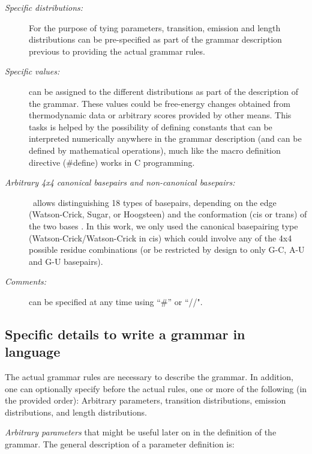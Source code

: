 \begin{description}
\item[\textsl{Specific distributions:}] For the purpose of tying
  parameters, transition, emission and length distributions can be
  pre-specified as part of the grammar description previous to
  providing the actual grammar rules.

\item[\textsl{Specific values:}] can be assigned to the
  different distributions as part of the description of the
  grammar. These values could be free-energy changes obtained from
  thermodynamic data or arbitrary scores provided by other means.
  This tasks is helped by the possibility of defining constants that
  can be interpreted numerically anywhere in the grammar description
  (and can be defined by mathematical operations), much like the macro
  definition directive (\#define) works in C programming.


\item[\textsl{Arbitrary 4x4 canonical basepairs and non-canonical
    basepairs:}] \tornado\, allows distinguishing 18 types of
  basepairs, depending on the edge (Watson-Crick, Sugar, or Hoogsteen)
  and the conformation (cis or trans) of the two bases
  \citep{LeontisWesthof01}. In this work, we only used the canonical
  basepairing type (Watson-Crick/Watson-Crick in cis) which could
  involve any of the 4x4 possible residue combinations (or be
  restricted by design to only G-C, A-U and G-U basepairs).

\item[\textsl{Comments:}] can be specified at any time using ``\#'' or ``//".

\end{description}


\subsection{Specific details to write a grammar in \tornado\, language}
 
The actual grammar rules are necessary to describe the grammar.  In
addition, one can optionally specify before the actual rules, one or
more of the following (in the provided order): Arbitrary parameters,
transition distributions, emission distributions, and length
distributions.


 \textsl{Arbitrary parameters} that might
be useful later on in the definition of the grammar. The general
description of a parameter definition is:\\

